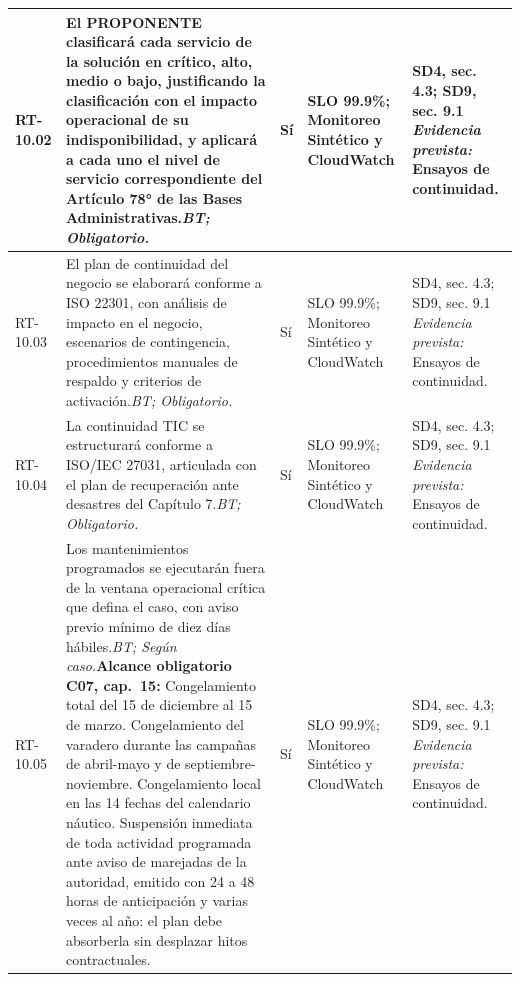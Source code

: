 \begin{paginaHorizontalSynaptix}
\begin{longtable}{|L{0.09\AnchoMatrizTDoce}|L{0.385\AnchoMatrizTDoce}|L{0.065\AnchoMatrizTDoce}|L{0.18\AnchoMatrizTDoce}|L{0.28\AnchoMatrizTDoce}|}
RT-\allowbreak{}10.\allowbreak{}02 &
El PROPONENTE clasificará cada servicio de la solución en crítico, alto, medio o bajo, justificando la clasificación con el impacto operacional de su indisponibilidad, y aplicará a cada uno el nivel de servicio correspondiente del Artículo 78° de las Bases Administrativas.\newline\textit{BT; Obligatorio.} &
Sí &
SLO 99.9\%; Monitoreo Sintético y CloudWatch &
SD4, sec. 4.3; SD9, sec. 9.1 \newline\textit{Evidencia prevista:} Ensayos de continuidad. \\ \hline

RT-\allowbreak{}10.\allowbreak{}03 &
El plan de continuidad del negocio se elaborará conforme a ISO 22301, con análisis de impacto en el negocio, escenarios de contingencia, procedimientos manuales de respaldo y criterios de activación.\newline\textit{BT; Obligatorio.} &
Sí &
SLO 99.9\%; Monitoreo Sintético y CloudWatch &
SD4, sec. 4.3; SD9, sec. 9.1 \newline\textit{Evidencia prevista:} Ensayos de continuidad. \\ \hline

RT-\allowbreak{}10.\allowbreak{}04 &
La continuidad TIC se estructurará conforme a ISO/IEC 27031, articulada con el plan de recuperación ante desastres del Capítulo 7.\newline\textit{BT; Obligatorio.} &
Sí &
SLO 99.9\%; Monitoreo Sintético y CloudWatch &
SD4, sec. 4.3; SD9, sec. 9.1 \newline\textit{Evidencia prevista:} Ensayos de continuidad. \\ \hline

RT-\allowbreak{}10.\allowbreak{}05 &
Los mantenimientos programados se ejecutarán fuera de la ventana operacional crítica que defina el caso, con aviso previo mínimo de diez días hábiles.\newline\textit{BT; Según caso.}\newline\textbf{Alcance obligatorio C07, cap.~15:} Congelamiento total del 15 de diciembre al 15 de marzo. Congelamiento del varadero durante las campañas de abril-mayo y de septiembre-noviembre. Congelamiento local en las 14 fechas del calendario náutico. Suspensión inmediata de toda actividad programada ante aviso de marejadas de la autoridad, emitido con 24 a 48 horas de anticipación y varias veces al año: el plan debe absorberla sin desplazar hitos contractuales. &
Sí &
SLO 99.9\%; Monitoreo Sintético y CloudWatch &
SD4, sec. 4.3; SD9, sec. 9.1 \newline\textit{Evidencia prevista:} Ensayos de continuidad. \\ \hline


\end{longtable}
\end{paginaHorizontalSynaptix}
